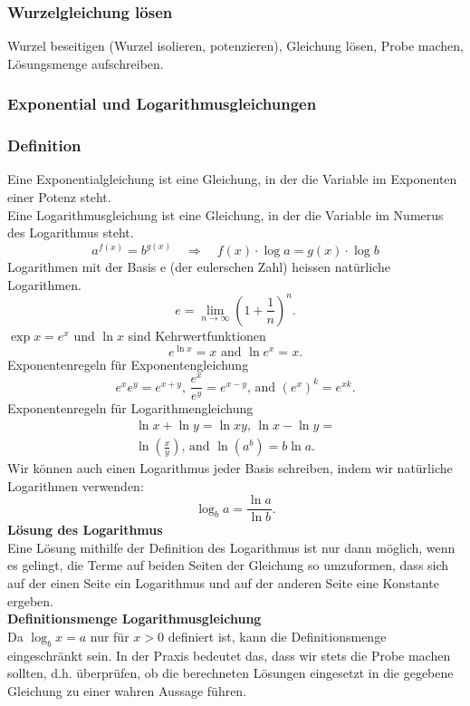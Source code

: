 \begin{multicols*}{3}
\subsubsection*{Wurzelgleichung lösen} 
Wurzel beseitigen (Wurzel isolieren, potenzieren), Gleichung lösen, Probe machen, Lösungsmenge aufschreiben.
\subsubsection*{Exponential und Logarithmusgleichungen}
\subsubsection*{Definition}
Eine Exponentialgleichung ist eine Gleichung, in der die Variable im Exponenten einer Potenz steht. \\
Eine Logarithmusgleichung ist eine Gleichung, in der die Variable im Numerus des Logarithmus steht.
\[a^{f(x)} = b^{g(x)} \quad \Rightarrow \quad f(x) \cdot \log a = g(x) \cdot \log b\]
Logarithmen mit der Basis e (der eulerschen Zahl) heissen natürliche Logarithmen.
\begin{equation*}
    e = \lim\limits_{n\rightarrow\infty}{\left(1+\frac{1}{n}\right)^n}.
\end{equation*}
$\exp{x} = e^x$ und $\ln{x}$ sind Kehrwertfunktionen
\begin{equation*}
    e^{\ln{x}} = x \text{ and } \ln{e^x} = x.
\end{equation*}
Exponentenregeln für Exponentengleichung
\begin{equation*}
    e^xe^y = e^{x+y} \text{, } \frac{e^x}{e^y}=e^{x-y} \text{, and } \left(e^x\right)^k=e^{xk}.
\end{equation*}
Exponentenregeln für Logarithmengleichung
\begin{equation*}
    \begin{aligned}
        \ln{x}+\ln{y} = \ln{xy} \text{, } \ln{x}-\ln{y} = \\
        \ln{\left(\frac{x}{y}\right)} \text{, and } \ln{\left(a^b\right)} = b\ln{a}.
    \end{aligned}
\end{equation*}
Wir können auch einen Logarithmus jeder Basis schreiben, indem wir natürliche Logarithmen verwenden:
\begin{equation*}
    \log_{b}{a} = \frac{\ln{a}}{\ln{b}}.
\end{equation*}
\textbf{Lösung des Logarithmus}\\
Eine Lösung mithilfe der Definition des Logarithmus ist nur dann möglich, wenn es gelingt, die Terme auf beiden Seiten der Gleichung so umzuformen, dass sich auf der einen Seite ein Logarithmus und auf der anderen Seite eine Konstante ergeben.\\
\textbf{Definitionsmenge Logarithmusgleichung }\\
Da $\log_{b}x = a$  nur für $x > 0$ definiert ist, kann die Definitionsmenge eingeschränkt sein.
In der Praxis bedeutet das, dass wir stets die Probe machen sollten, d.h. überprüfen, ob die berechneten Lösungen eingesetzt in die gegebene Gleichung zu einer wahren Aussage führen.\\

\end{multicols*}
